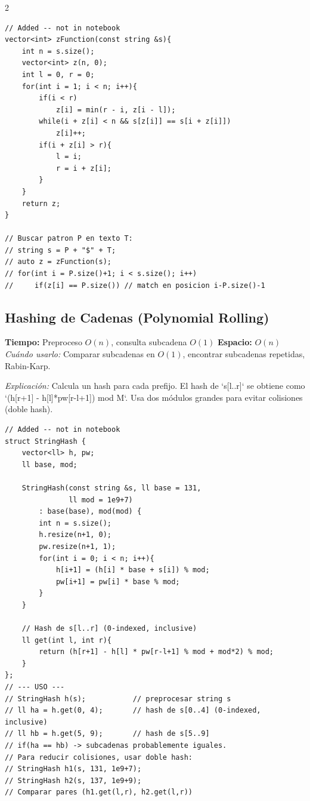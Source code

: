\documentclass[10pt,a4paper]{article}
\begin{document}
\begin{multicols}{2}
\begin{lstlisting}
// Added -- not in notebook
vector<int> zFunction(const string &s){
    int n = s.size();
    vector<int> z(n, 0);
    int l = 0, r = 0;
    for(int i = 1; i < n; i++){
        if(i < r)
            z[i] = min(r - i, z[i - l]);
        while(i + z[i] < n && s[z[i]] == s[i + z[i]])
            z[i]++;
        if(i + z[i] > r){
            l = i;
            r = i + z[i];
        }
    }
    return z;
}

// Buscar patron P en texto T:
// string s = P + "$" + T;
// auto z = zFunction(s);
// for(int i = P.size()+1; i < s.size(); i++)
//     if(z[i] == P.size()) // match en posicion i-P.size()-1
\end{lstlisting}

\subsection{Hashing de Cadenas (Polynomial Rolling)}
\textbf{Tiempo:} Preproceso $O(n)$, consulta subcadena $O(1)$ \quad \textbf{Espacio:} $O(n)$\\
\textit{Cu\'ando usarlo:} Comparar subcadenas en $O(1)$, encontrar subcadenas repetidas, Rabin-Karp.

\textit{Explicación:} Calcula un hash para cada prefijo. El hash de `s[l..r]` se obtiene como `(h[r+1] - h[l]*pw[r-l+1]) mod M`. Usa dos módulos grandes para evitar colisiones (doble hash).

\begin{lstlisting}
// Added -- not in notebook
struct StringHash {
    vector<ll> h, pw;
    ll base, mod;

    StringHash(const string &s, ll base = 131,
               ll mod = 1e9+7)
        : base(base), mod(mod) {
        int n = s.size();
        h.resize(n+1, 0);
        pw.resize(n+1, 1);
        for(int i = 0; i < n; i++){
            h[i+1] = (h[i] * base + s[i]) % mod;
            pw[i+1] = pw[i] * base % mod;
        }
    }

    // Hash de s[l..r] (0-indexed, inclusive)
    ll get(int l, int r){
        return (h[r+1] - h[l] * pw[r-l+1] % mod + mod*2) % mod;
    }
};
// --- USO ---
// StringHash h(s);           // preprocesar string s
// ll ha = h.get(0, 4);       // hash de s[0..4] (0-indexed, inclusive)
// ll hb = h.get(5, 9);       // hash de s[5..9]
// if(ha == hb) -> subcadenas probablemente iguales.
// Para reducir colisiones, usar doble hash:
// StringHash h1(s, 131, 1e9+7);
// StringHash h2(s, 137, 1e9+9);
// Comparar pares (h1.get(l,r), h2.get(l,r))
\end{lstlisting}


\end{multicols}
\end{document}
